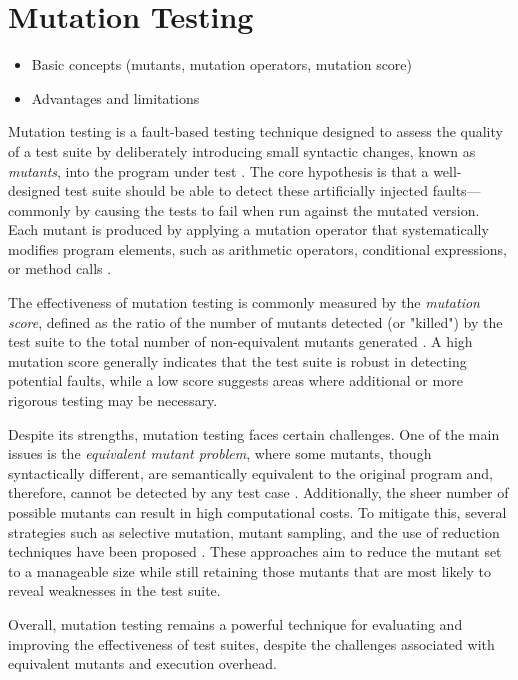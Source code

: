 \documentclass[sigplan, nonacm]{acmart}
\begin{document}
\section{Mutation Testing}
\begin{itemize}
    \item Basic concepts (mutants, mutation operators, mutation score)
    \item Advantages and limitations
\end{itemize}
Mutation testing is a fault-based testing technique designed to assess the quality of a test suite by deliberately introducing small syntactic changes, known as \emph{mutants}, into the program under test \cite{offutt_mutation_2001}. The core hypothesis is that a well-designed test suite should be able to detect these artificially injected faults—commonly by causing the tests to fail when run against the mutated version. Each mutant is produced by applying a mutation operator that systematically modifies program elements, such as arithmetic operators, conditional expressions, or method calls \cite{JiaHarman2000}.

The effectiveness of mutation testing is commonly measured by the \emph{mutation score}, defined as the ratio of the number of mutants detected (or "killed") by the test suite to the total number of non-equivalent mutants generated \cite{offutt_mutation_2001}. A high mutation score generally indicates that the test suite is robust in detecting potential faults, while a low score suggests areas where additional or more rigorous testing may be necessary.

Despite its strengths, mutation testing faces certain challenges. One of the main issues is the \emph{equivalent mutant problem}, where some mutants, though syntactically different, are semantically equivalent to the original program and, therefore, cannot be detected by any test case \cite{offutt_mutation_2001}. Additionally, the sheer number of possible mutants can result in high computational costs. To mitigate this, several strategies such as selective mutation, mutant sampling, and the use of reduction techniques have been proposed \cite{JiaHarman2000, Schuler2009}. These approaches aim to reduce the mutant set to a manageable size while still retaining those mutants that are most likely to reveal weaknesses in the test suite.

Overall, mutation testing remains a powerful technique for evaluating and improving the effectiveness of test suites, despite the challenges associated with equivalent mutants and execution overhead.
\end{document}
